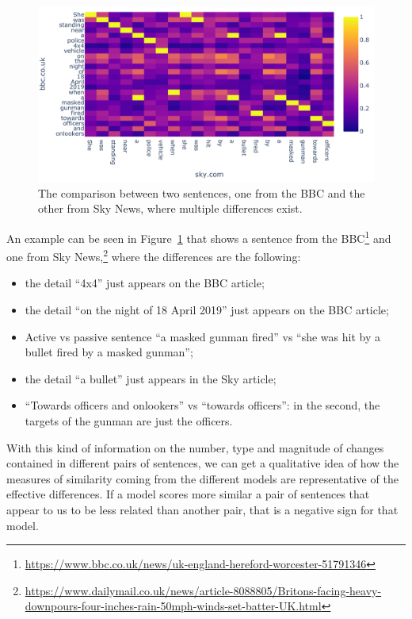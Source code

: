 

\begin{figure}[!htb]
    \centering
    \includegraphics[width=0.9\linewidth]{figures/lyra.pdf}
    \caption{The comparison between two sentences, one from the BBC and the other from Sky News, where multiple differences exist.}
    \label{fig:lyra}
\end{figure}

An example can be seen in Figure~\ref{fig:lyra} that shows a sentence from the BBC\footnote{\url{https://www.bbc.co.uk/news/uk-england-hereford-worcester-51791346}} and one from Sky News,\footnote{\url{https://www.dailymail.co.uk/news/article-8088805/Britons-facing-heavy-downpours-four-inches-rain-50mph-winds-set-batter-UK.html}} where the differences are the following:

\begin{itemize}
    \item the detail ``4x4'' just appears on the BBC article;
    \item the detail ``on the night of 18 April 2019'' just appears on the BBC article;
    \item Active vs passive sentence ``a masked gunman fired'' vs ``she was hit by a bullet fired by a masked gunman'';
    \item the detail ``a bullet'' just appears in the Sky article;
    \item ``Towards officers and onlookers'' vs ``towards officers'': in the second, the targets of the gunman are just the officers.
\end{itemize}

With this kind of information on the number, type and magnitude of changes contained in different pairs of sentences, we can get a qualitative idea of how the measures of similarity coming from the different models are representative of the effective differences. If a model scores more similar a pair of sentences that appear to us to be less related than another pair, that is a negative sign for that model. 



